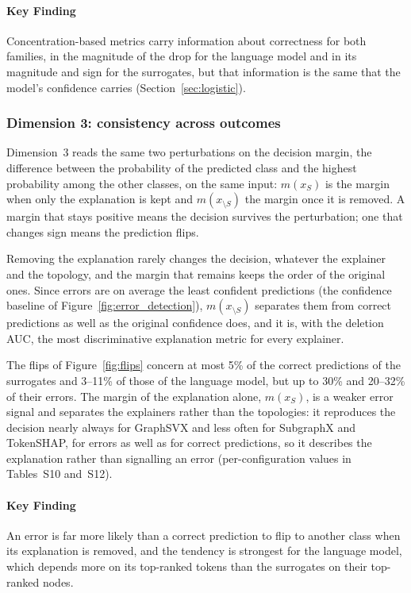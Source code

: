 \documentclass[preprint, times, review, 10pt]{elsarticle}
\begin{document}
\paragraph{\textbf{Key Finding}}
Concentration-based metrics carry information about correctness for both families, in the magnitude of the drop for the language model and in its magnitude and sign for the surrogates, but that information is the same that the model's confidence carries (Section~\ref{sec:logistic}).

\subsubsection{Dimension 3: consistency across outcomes}

Dimension~3 reads the same two perturbations on the decision margin, the difference between the probability of the predicted class and the highest probability among the other classes, on the same input: \(m(x_S)\) is the margin when only the explanation is kept and \(m(x_{\setminus S})\) the margin once it is removed. A margin that stays positive means the decision survives the perturbation; one that changes sign means the prediction flips.

Removing the explanation rarely changes the decision, whatever the explainer and the topology, and the margin that remains keeps the order of the original ones. Since errors are on average the least confident predictions (the confidence baseline of Figure~\ref{fig:error_detection}), \(m(x_{\setminus S})\) separates them from correct predictions as well as the original confidence does, and it is, with the deletion AUC, the most discriminative explanation metric for every explainer.

The flips of Figure~\ref{fig:flips} concern at most 5\% of the correct predictions of the surrogates and 3--11\% of those of the language model, but up to 30\% and 20--32\% of their errors. The margin of the explanation alone, \(m(x_S)\), is a weaker error signal and separates the explainers rather than the topologies: it reproduces the decision nearly always for GraphSVX and less often for SubgraphX and TokenSHAP, for errors as well as for correct predictions, so it describes the explanation rather than signalling an error (per-configuration values in Tables~S10 and~S12).

\paragraph{\textbf{Key Finding}}
An error is far more likely than a correct prediction to flip to another class when its explanation is removed, and the tendency is strongest for the language model, which depends more on its top-ranked tokens than the surrogates on their top-ranked nodes.
\end{document}
